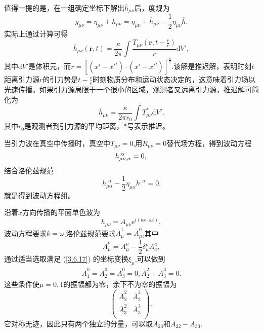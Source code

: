 \documentclass[11pt, a4paper, oneside, onecolumn]{ctexart}
\numberwithin{equation}{subsection}
\begin{document}
值得一提的是，在一组确定坐标下解出$\overline{h}_{\mu\nu}$后，度规为
\begin{equation}
g_{\mu\nu}=\eta_{\mu\nu}+h_{\mu\nu}=\eta_{\mu\nu}+\overline{h}_{\mu\nu}-\frac12\eta_{\mu\nu}\overline{h}.
\end{equation}
实际上通过计算可得
\begin{equation}
\overline{h}_{\mu\nu}\left(\boldsymbol{r},t\right)=\frac{\kappa}{2\pi}\int\frac{T_{\mu\nu}\left(\boldsymbol{r},t-\frac{r}{c}\right)}{r}\mathrm{d}V',
\end{equation}
其中$\mathrm{d}V'$是体积元，而$r=\left[\left(x^{i}-x'^{i}\right)\cdot\left(x^{i}-x'^{i}\right)\right]^{\frac12}$.该解是推迟解，表明时刻$t$距离引力源$r$的引力势是$t-\frac{r}{c}$时刻物质分布和运动状态决定的，这意味着引力场以光速传播。如果引力源局限于一个很小的区域，观测者又远离引力源，推迟解可简化为
\begin{equation}
\overline{h}_{\mu\nu}=\frac{\kappa}{2\pi r_{0}}\int T_{\mu\nu}^{*}\mathrm{d}V'.
\end{equation}
其中$r_{0}$是观测者到引力源的平均距离，*号表示推迟。

当引力波在真空中传播时，真空中$T_{\mu\nu}=0$,用$R_{\mu\nu}=0$替代场方程，得到波动方程
\begin{equation}
h^{,\alpha}_{\mu\nu,\alpha}=0,\\
\end{equation}
结合洛伦兹规范
\begin{equation}
h^{,\alpha}_{\mu\alpha}-\frac{1}{2}\eta_{\mu\alpha}h^{,\alpha}=0.
\end{equation}
就是得到波动方程组。

沿着$x$方向传播的平面单色波为
\begin{equation}
h_{\mu\nu}=A_{\mu\nu}\mathrm{e}^{i\left(kx\cdot\omega t\right)},
\end{equation}
波动方程要求$k=\omega$,洛伦兹规范要求$\overline{A}^{1}_{\mu}=\overline{A}^{0}_{\mu}$,其中
\begin{equation}
\overline{A}^{\nu}_{\mu}=A^{\nu}_{\mu}-\frac{1}{2}\delta{}^{\nu}_{\mu}A^{a}_{a},
\end{equation}
通过适当选取满足 (\ref{3.6.17}) 的坐标变换$\xi_{\mu}$,可以做到
\begin{align}
\overline{A}^{0}_{1}=\overline{A}^{0}_{2}=\overline{A}^{0}_{3}=0,\overline{A}^{2}_{2}+\overline{A}^{3}_{3}=0.
\end{align}
这些条件使$\mu=0,1$的振幅都为零，余下不为零的振幅为
\begin{equation}
\begin{pmatrix}
\overline{A}^{2}_{2} & \overline{A}^{3}_{2}\\
\overline{A}^{2}_{3} & \overline{A}^{3}_{3}\\
\end{pmatrix},
\end{equation}
它对称无迹，因此只有两个独立的分量，可以取$A_{23}$和$A_{22}-A_{33}$.
\end{document}
